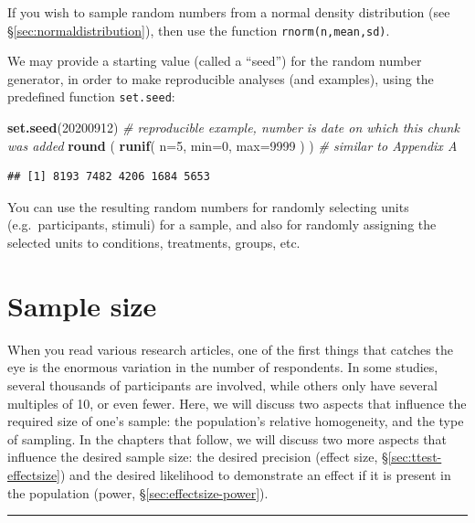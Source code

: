 \documentclass[
]{book}
\newenvironment{Shaded}{\begin{snugshade}}{\end{snugshade}}
\newcommand{\AttributeTok}[1]{\textcolor[rgb]{0.13,0.29,0.53}{#1}}
\newcommand{\CommentTok}[1]{\textcolor[rgb]{0.56,0.35,0.01}{\textit{#1}}}
\newcommand{\DecValTok}[1]{\textcolor[rgb]{0.00,0.00,0.81}{#1}}
\newcommand{\FunctionTok}[1]{\textcolor[rgb]{0.13,0.29,0.53}{\textbf{#1}}}
\newcommand{\NormalTok}[1]{#1}
\begin{document}
If you wish to sample random numbers from a normal density distribution (see §\ref{sec:normaldistribution}), then use the function \texttt{rnorm(n,mean,sd)}.

We may provide a starting value (called a ``seed'') for the random number generator, in order to make reproducible analyses (and examples), using the predefined function \texttt{set.seed}:

\begin{Shaded}
\begin{Highlighting}[]
\FunctionTok{set.seed}\NormalTok{(}\DecValTok{20200912}\NormalTok{) }\CommentTok{\# reproducible example, number is date on which this chunk was added}
\FunctionTok{round}\NormalTok{ ( }\FunctionTok{runif}\NormalTok{( }\AttributeTok{n=}\DecValTok{5}\NormalTok{, }\AttributeTok{min=}\DecValTok{0}\NormalTok{, }\AttributeTok{max=}\DecValTok{9999}\NormalTok{ ) ) }\CommentTok{\# similar to Appendix A}
\end{Highlighting}
\end{Shaded}

\begin{verbatim}
## [1] 8193 7482 4206 1684 5653
\end{verbatim}

You can use the resulting random numbers for randomly selecting units (e.g.~participants, stimuli) for a sample, and also for randomly assigning the selected units to conditions, treatments, groups, etc.

\section{Sample size}\label{sec:sample-size}

When you read various research articles, one of the first things that catches the eye is the enormous variation in the number of respondents. In some studies, several thousands of participants are involved, while others only have several multiples of 10, or even fewer. Here, we will discuss two aspects that influence the required size of one's sample: the population's relative homogeneity, and the type of sampling. In the chapters that follow, we will discuss two more aspects that influence the desired sample size: the desired precision (effect size, §\ref{sec:ttest-effectsize}) and the desired likelihood to demonstrate an effect if it is present in the population (power, §\ref{sec:effectsize-power}).

\begin{center}\rule{0.5\linewidth}{0.5pt}\end{center}
\end{document}
